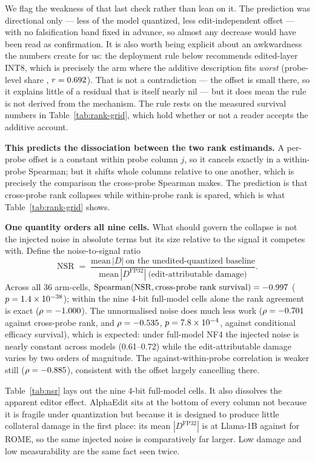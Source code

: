 \documentclass[preprint,12pt]{elsarticle}
\begin{document}
We flag the weakness of that last check rather than lean on it. The prediction was
directional only --- less of the model quantized, less edit-independent offset --- with
no falsification band fixed in advance, so almost any decrease would have been read as
confirmation. It is also worth being explicit about an awkwardness the numbers create
for us: the deployment rule below recommends edited-layer INT8, which is precisely the
arm where the additive description fits \emph{worst} (probe-level share
\pAddShareIntEL{}, $r=0.692{}$). That is not a contradiction --- the offset is
small there, so it explains little of a residual that is itself nearly nil --- but it
does mean the rule is not derived from the mechanism. The rule rests on the measured
survival numbers in Table~\ref{tab:rank-grid}, which hold whether or not a reader accepts
the additive account.

\textbf{This predicts the dissociation between the two rank estimands.} A per-probe
offset is a constant within probe column $j$, so it cancels exactly in a within-probe
Spearman; but it shifts whole columns relative to one another, which is precisely the
comparison the cross-probe Spearman makes. The prediction is that cross-probe rank
collapses while within-probe rank is spared, which is what
Table~\ref{tab:rank-grid} shows.

\textbf{One quantity orders all nine cells.} What should govern the collapse is not the
injected noise in absolute terms but its size relative to the signal it competes with.
Define the noise-to-signal ratio
\[
\mathrm{NSR} \;=\; \frac{\text{mean}\,|D|\ \text{on the unedited-quantized baseline}}
{\text{mean}\,|D^{\mathrm{FP32}}|\ \text{(edit-attributable damage)}} .
\]
Across all 36 arm-cells, $\operatorname{Spearman}(\mathrm{NSR}, \text{cross-probe rank
survival}) = -0.997{}$ ($p=1.4\times10^{-38}{}$); within the nine 4-bit full-model
cells alone the rank agreement is exact ($\rho=-1.000{}$). The unnormalised
noise does much less work ($\rho=-0.701{}$ against cross-probe rank, and
$\rho=-0.535{}$, $p=7.8\times10^{-4}{}$, against conditional efficacy survival),
which is expected: under full-model NF4 the injected noise is nearly constant across
models (0.61--0.72) while the edit-attributable damage varies by two orders of
magnitude. The against-within-probe correlation is weaker still
($\rho=-0.885{}$), consistent with the offset largely cancelling there.

Table~\ref{tab:nsr} lays out the nine 4-bit full-model cells. It also dissolves the
apparent editor effect. AlphaEdit sits at the bottom of every column not because it is
fragile under quantization but because it is designed to produce little collateral
damage in the first place: its mean $|D^{\mathrm{FP32}}|$ is \pSigLOneAlpha{} at
Llama-1B against \pSigLOneRome{} for ROME, so the same injected noise is comparatively
far larger. Low damage and low measurability are the same fact seen twice.
\end{document}
